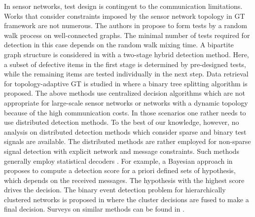 \documentclass[journal]{IEEEtran}
\begin{document}
In sensor networks, test design is contingent to the communication limitations. Works that consider constraints imposed by the sensor network topology in GT framework are not numerous. The authors in \cite{Cheraghchi:10} propose to form tests by a random walk process on well-connected graphs. The minimal number of tests required for detection in this case depends on the random walk mixing time. A bipartite graph structure is considered in \cite{Mezard:07} with a two-stage hybrid detection method. Here, a subset of defective items in the first stage is determined by pre-designed tests, while the remaining items are tested individually in the next step. Data retrieval for topology-adaptive GT is studied in \cite{Hong:04} where a binary tree splitting algorithm is proposed. The above methods use centralized decision algorithms which are not appropriate for large-scale sensor networks or networks with a dynamic topology because of the high communication costs. In those scenarios one rather needs to use distributed detection methods. To the best of our knowledge, however, no analysis on distributed detection methods which consider sparse and binary test signals are available. The distributed methods are rather employed for non-sparse signal detection with explicit network and message constraints. Such methods generally employ statistical decoders \cite{Varshney:97}.
For example, a Bayesian approach in \cite{Tsitsiklis:93} proposes to compute a detection score for a priori defined sets of hypothesis, which depends on the received messages. The hypothesis with the highest score drives the decision. The binary event detection problem for hierarchically clustered networks is proposed in \cite{Tian:07} where the cluster decisions are fused to make a final decision. Surveys on similar methods can be found in \cite{Viswanathan:97,Blum:97}. 
\end{document}
